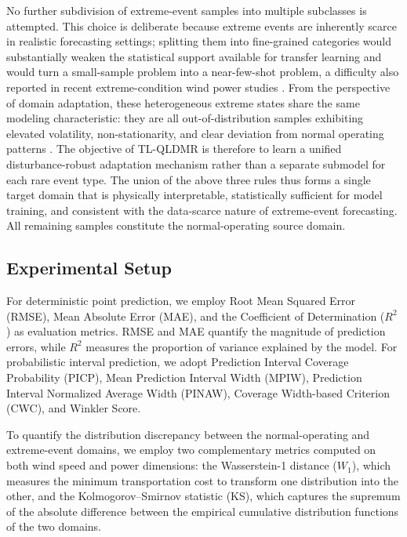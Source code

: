 \documentclass[a4paper]{cas-sc}
\begin{document}
No further subdivision of extreme-event samples into multiple subclasses is attempted. This choice is deliberate because extreme events are inherently scarce in realistic forecasting settings; splitting them into fine-grained categories would substantially weaken the statistical support available for transfer learning and would turn a small-sample problem into a near-few-shot problem, a difficulty also reported in recent extreme-condition wind power studies \citep{liang2025coldwave}. From the perspective of domain adaptation, these heterogeneous extreme states share the same modeling characteristic: they are all out-of-distribution samples exhibiting elevated volatility, non-stationarity, and clear deviation from normal operating patterns \citep{pan2010survey, bendavid2010theory}. The objective of TL-QLDMR is therefore to learn a unified disturbance-robust adaptation mechanism rather than a separate submodel for each rare event type. The union of the above three rules thus forms a single target domain that is physically interpretable, statistically sufficient for model training, and consistent with the data-scarce nature of extreme-event forecasting. All remaining samples constitute the normal-operating source domain.

\subsection{Experimental Setup}\label{sec:setup}

For deterministic point prediction, we employ Root Mean Squared Error (RMSE), Mean Absolute Error (MAE), and the Coefficient of Determination ($R^2$) as evaluation metrics. RMSE and MAE quantify the magnitude of prediction errors, while $R^2$ measures the proportion of variance explained by the model. For probabilistic interval prediction, we adopt Prediction Interval Coverage Probability (PICP), Mean Prediction Interval Width (MPIW), Prediction Interval Normalized Average Width (PINAW), Coverage Width-based Criterion (CWC), and Winkler Score.

To quantify the distribution discrepancy between the normal-operating and extreme-event domains, we employ two complementary metrics computed on both wind speed and power dimensions: the Wasserstein-1 distance ($W_1$), which measures the minimum transportation cost to transform one distribution into the other, and the Kolmogorov--Smirnov statistic (KS), which captures the supremum of the absolute difference between the empirical cumulative distribution functions of the two domains.
\end{document}
